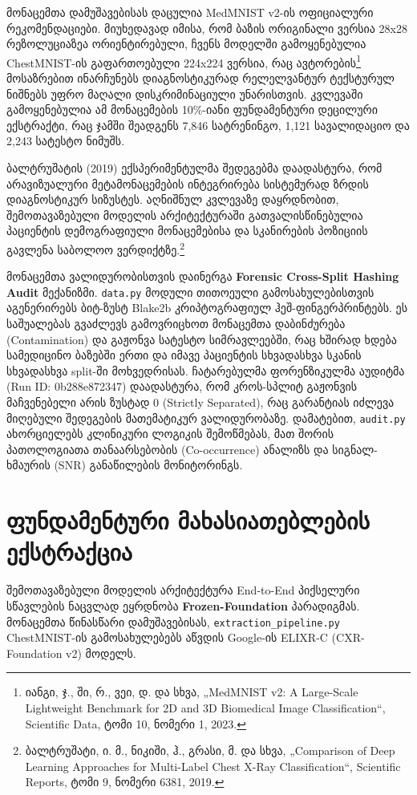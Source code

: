 \documentclass[12pt,a4paper,oneside]{report}
\begin{document}
მონაცემთა დამუშავებისას დაცულია MedMNIST v2-ის ოფიციალური რეკომენდაციები. მიუხედავად იმისა, რომ ბაზის ორიგინალი ვერსია 28x28 რეზოლუციაზეა ორიენტირებული, ჩვენს მოდელში გამოყენებულია ChestMNIST-ის გაფართოებული 224x224 ვერსია, რაც ავტორების\footnote{იანგი, ჯ., ში, რ., ვეი, დ. და სხვა, „MedMNIST v2: A Large-Scale Lightweight Benchmark for 2D and 3D Biomedical Image Classification“, Scientific Data, ტომი 10, ნომერი 1, 2023.} მოსაზრებით ინარჩუნებს დიაგნოსტიკურად რელელვანტურ ტექსტურულ ნიშნებს უფრო მაღალი დისკრიმინაციული უნარისთვის. კვლევაში გამოყენებულია ამ მონაცემების 10\%-იანი ფუნდამენტური დეცილური ექსტრაქტი, რაც ჯამში შეადგენს 7,846 სატრენინგო, 1,121 სავალიდაციო და 2,243 სატესტო ნიმუშს.

ბალტრუშატის (2019) ექსპერიმენტულმა შედეგებმა დაადასტურა, რომ არავიზუალური მეტამონაცემების ინტეგრირება სისტემურად ზრდის დიაგნოსტიკურ სიზუსტეს. აღნიშნულ კვლევაზე დაყრდნობით, შემოთავაზებული მოდელის არქიტექტურაში გათვალისწინებულია პაციენტის დემოგრაფიული მონაცემებისა და სკანირების პოზიციის გავლენა საბოლოო ვერდიქტზე.\footnote{ბალტრუშატი, ი. მ., ნიკიში, ჰ., გრასი, მ. და სხვა, „Comparison of Deep Learning Approaches for Multi-Label Chest X-Ray Classification“, Scientific Reports, ტომი 9, ნომერი 6381, 2019.}

მონაცემთა ვალიდურობისთვის დაინერგა \textbf{Forensic Cross-Split Hashing Audit} მექანიზმი. \texttt{data.py} მოდული თითოეული გამოსახულებისთვის აგენერირებს ბიტ-ზუსტ Blake2b კრიპტოგრაფიულ ჰეშ-ფინგერპრინტებს. ეს საშუალებას გვაძლევს გამოვრიცხოთ მონაცემთა დაბინძურება (Contamination) და გაჟონვა სატესტო სიმრავლეებში, რაც ხშირად ხდება სამედიცინო ბაზებში ერთი და იმავე პაციენტის სხვადასხვა სკანის სხვადასხვა split-ში მოხვედრისას. ჩატარებულმა ფორენზიკულმა აუდიტმა (Run ID: 0b288e872347) დაადასტურა, რომ კროს-სპლიტ გაჟონვის მაჩვენებელი არის ზუსტად 0 (Strictly Separated), რაც გარანტიას იძლევა მიღებული შედეგების მათემატიკურ ვალიდურობაზე. დამატებით, \texttt{audit.py} ახორციელებს კლინიკური ლოგიკის შემოწმებას, მათ შორის პათოლოგიათა თანაარსებობის (Co-occurrence) ანალიზს და სიგნალ-ხმაურის (SNR) განაწილების მონიტორინგს.

\section{ფუნდამენტური მახასიათებლების ექსტრაქცია}
შემოთავაზებული მოდელის არქიტექტურა End-to-End პიქსელური სწავლების ნაცვლად ეყრდნობა \textbf{Frozen-Foundation} პარადიგმას. მონაცემთა წინასწარი დამუშავებისას, \texttt{extraction\_pipeline.py} ChestMNIST-ის გამოსახულებებს აწვდის Google-ის ELIXR-C (CXR-Foundation v2) მოდელს. 
\end{document}
